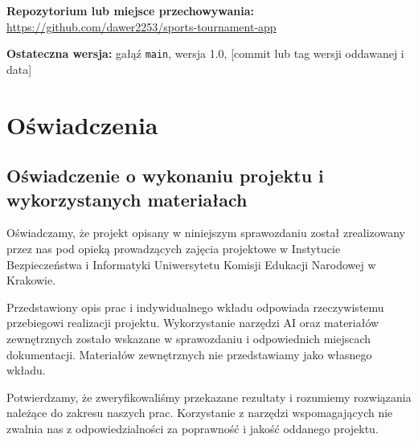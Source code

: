 \documentclass[11pt,a4paper,oneside]{article}
\newif\ifpodpowiedzi
\newcommand{\podpowiedz}[1]{\ifpodpowiedzi\par\begingroup\small\color{hintcolor}\textit{Wskazówka: #1}\par\endgroup\fi}
\newcommand{\pole}[1]{\textnormal{[#1]}}
\begin{document}
\podpowiedz{Dla projektu programistycznego podaj repozytorium i commit lub tag. Dla innych projektów podaj miejsce przechowywania i oznaczenie wersji plików. Odnośnik nie zastępuje przekazania kompletu plików do archiwizacji.}
\textbf{Repozytorium lub miejsce przechowywania:} \url{https://github.com/dawer2253/sports-tournament-app}\par
\textbf{Ostateczna wersja:} gałąź \texttt{main}, wersja 1.0, \pole{commit lub tag wersji oddawanej i data}

\section{Oświadczenia}
\subsection{Oświadczenie o wykonaniu projektu i wykorzystanych materiałach}
\podpowiedz{Przed podpisaniem upewnijcie się, że treść jest zgodna z rzeczywistym przebiegiem prac i że ujawniono wykorzystanie AI oraz materiałów zewnętrznych. Oświadczenie podpisują wszyscy członkowie zespołu.}

Oświadczamy, że projekt opisany w niniejszym sprawozdaniu został zrealizowany przez nas pod opieką prowadzących zajęcia projektowe w Instytucie Bezpieczeństwa i Informatyki Uniwersytetu Komisji Edukacji Narodowej w Krakowie.

Przedstawiony opis prac i indywidualnego wkładu odpowiada rzeczywistemu przebiegowi realizacji projektu. Wykorzystanie narzędzi AI oraz materiałów zewnętrznych zostało wskazane w sprawozdaniu i odpowiednich miejscach dokumentacji. Materiałów zewnętrznych nie przedstawiamy jako własnego wkładu.

Potwierdzamy, że zweryfikowaliśmy przekazane rezultaty i rozumiemy rozwiązania należące do zakresu naszych prac. Korzystanie z narzędzi wspomagających nie zwalnia nas z odpowiedzialności za poprawność i jakość oddanego projektu.
\podpisy

\end{document}
